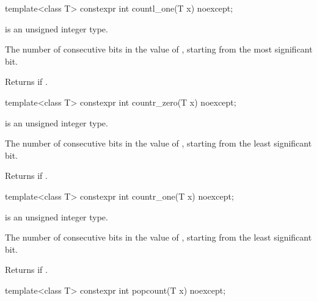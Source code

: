 \begin{itemdecl}
template<class T>
  constexpr int countl_one(T x) noexcept;
\end{itemdecl}

%
\begin{itemdescr}
\pnum
\constraints
{} is an unsigned integer type.

\pnum
\returns
The number of consecutive  bits in the value of ,
starting from the most significant bit.
\begin{note}
Returns  if .
\end{note}
\end{itemdescr}

\begin{itemdecl}
template<class T>
  constexpr int countr_zero(T x) noexcept;
\end{itemdecl}

%
\begin{itemdescr}
\pnum
\constraints
{} is an unsigned integer type.

\pnum
\returns
The number of consecutive  bits in the value of ,
starting from the least significant bit.
\begin{note}
Returns  if .
\end{note}
\end{itemdescr}

\begin{itemdecl}
template<class T>
  constexpr int countr_one(T x) noexcept;
\end{itemdecl}

%
\begin{itemdescr}
\pnum
\constraints
{} is an unsigned integer type.

\pnum
\returns
The number of consecutive  bits in the value of ,
starting from the least significant bit.
\begin{note}
Returns  if .
\end{note}
\end{itemdescr}

\begin{itemdecl}
template<class T>
  constexpr int popcount(T x) noexcept;
\end{itemdecl}

